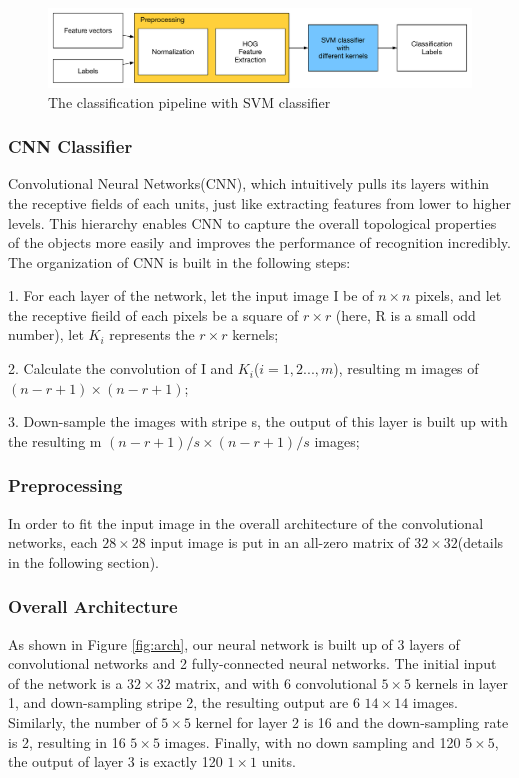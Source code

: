 \documentclass[12pt]{article}
\begin{document}
\begin{figure}[tbp]
	\centering
	\includegraphics[width =\textwidth]{pipeline-svm}		
	\caption{The classification pipeline with SVM classifier}
	\label{fig:pipeline-svm}
\end{figure}
 
\subsubsection{CNN Classifier}
Convolutional Neural Networks(CNN)\cite{krizhevsky2012imagenet}, which intuitively pulls its layers within the receptive fields of each units, just like extracting features from lower to higher levels. This hierarchy enables CNN to capture the overall topological properties of the objects more easily and improves the performance of recognition incredibly\cite{lecun1998gradient}.
The organization of CNN is built in the following steps: 

1. For each layer of the network, let the input image I be of $n \times n$ pixels, and let the receptive fieild of each pixels be a square of $r\times r$ (here, R is a small odd number), let $K_i$ represents the $r\times r$ kernels;

2. Calculate the convolution of I and $K_i$($i = 1,2...,m$), resulting m images of $(n-r+1) \times (n-r+1)$;

3. Down-sample the images with stripe s, the output of this layer is built up with the resulting m $(n-r+1)/s \times (n-r+1)/s$ images;
\subsubsection{Preprocessing}

In order to fit the input image in the overall architecture of the convolutional networks, each $28\times 28$ input image is put in an all-zero matrix of $32\times 32$(details in the following section).

\subsubsection{Overall Architecture}

As shown in Figure \ref{fig:arch}, our neural network is built up of 3 layers of convolutional networks and 2 fully-connected neural networks. The initial input of the network is a $32\times 32$ matrix, and with 6 convolutional $5\times 5$ kernels in layer 1, and down-sampling stripe 2, the resulting output are 6 $14\times 14$ images. Similarly, the number of $5\times 5$ kernel for layer 2 is 16 and the down-sampling rate is 2, resulting in 16 $5\times 5$ images. Finally, with no down sampling and 120 $5\times 5$, the output of layer 3 is exactly 120 $1\times 1$ units.
\end{document}
